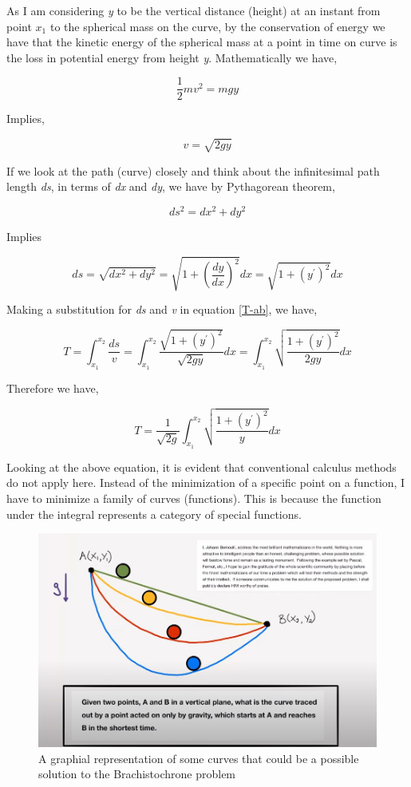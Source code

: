 {As I am considering \textit{y} to be the vertical distance (height) at an instant from point $x_{1}$ to the spherical mass on the curve, by the conservation of energy we have that the kinetic energy of the spherical mass at a point in time on curve is the loss in potential energy from height \textit{y}. Mathematically we have,}

	$$\frac{1}{2}mv^2 = mgy$$ 

{Implies,}

	$$v = \sqrt{2gy}$$

{If we look at the path (curve) closely and think about the infinitesimal path length \textit{ds}, in terms of \textit{dx} and \textit{dy}, we have by Pythagorean theorem,}

	$$ds^2 = dx^2 + dy^2$$

{Implies}

	$$ds = \sqrt{dx^2 + dy^2} = \sqrt{1 + \left(\frac{dy}{dx}\right)^2} dx = \sqrt{1 + \left(y^{\prime}\right)^2} dx$$

{Making a substitution for \textit{ds} and \textit{v} in equation \ref{T-ab}, we have,}

	$$T = \int_{x_1}^{x_2} \frac{ds}{v} = \int_{x_1}^{x_2} \frac{\sqrt{1 + \left(y^{\prime}\right)^2}}{\sqrt{2gy}} dx = \int_{x_1}^{x_2} \sqrt{\frac{1 + \left(y^{\prime}\right)^2}{2gy}} dx$$

{Therefore we have,}

	\begin{equation}
		T = \frac{1}{\sqrt{2g}}\int_{x_1}^{x_2} \sqrt{\frac{1 + \left(y^{\prime}\right)^2}{y}} dx
		\label{Tmin}
	\end{equation}

{Looking at the above equation, it is evident that conventional calculus methods do not apply here. Instead of the minimization of a specific point on a function, I have to minimize a family of curves (functions). This is because the function under the integral represents a category of special functions.}

\begin{figure}[H]
\centering
\includegraphics[width=13cm]{OrgProbDia.jpg}
    		\caption{{A graphial representation of some curves that could be a possible solution to the Brachistochrone problem}}
\end{figure}

